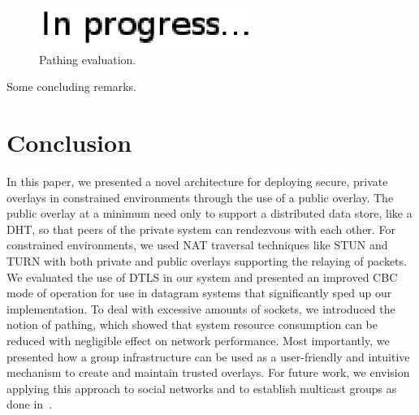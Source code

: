 \documentclass[conference]{IEEEtran}
\begin{document}
\begin{figure}[h]
\centering
\includegraphics[width=2.75in]{in_progress.eps}
\caption{Pathing evaluation.}
\label{fig:pathing_eval}
\end{figure}

Some concluding remarks.

\section{Conclusion}
\label{conclusions}
In this paper, we presented a novel architecture for deploying secure, private
overlays in constrained environments through the use of a public overlay.
The public overlay at a minimum need only to support a distributed data store,
like a DHT, so that peers of the private system can rendezvous with each other.
For constrained environments, we used NAT traversal techniques like STUN and
TURN with both private and public overlays supporting the relaying of packets.
We evaluated the use of DTLS in our system and presented an improved CBC
mode of operation for use in datagram systems that significantly sped up our
implementation.  To deal with excessive amounts of sockets, we introduced the
notion of pathing, which showed that system resource consumption can be reduced
with negligible effect on network performance.  Most importantly, we presented
how a group infrastructure can be used as a user-friendly and intuitive
mechanism to create and maintain trusted overlays.  For future work, we envision
applying this approach to social networks and to establish multicast groups as
done in~\cite{can}.



\suppressfloats
\end{document}
